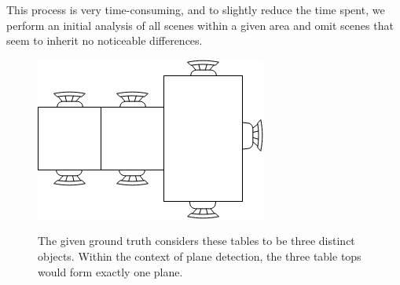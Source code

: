 \documentclass[main.tex]{subfiles}
\begin{document}
This process is very time-consuming, and to slightly reduce the time spent, we perform an initial analysis of all scenes within a 
given area and omit scenes that seem to inherit no noticeable differences.


\begin{figure} [!ht]
	\centering
	\includegraphics[width=10 cm]{images/tables.png}
	\label{fig:tables}
    \caption[Ground Truth Table Example]{The given ground truth considers these tables to be three distinct objects. Within the context of 
    plane detection, the three table tops would form exactly one plane.}
\end{figure}
\end{document}
